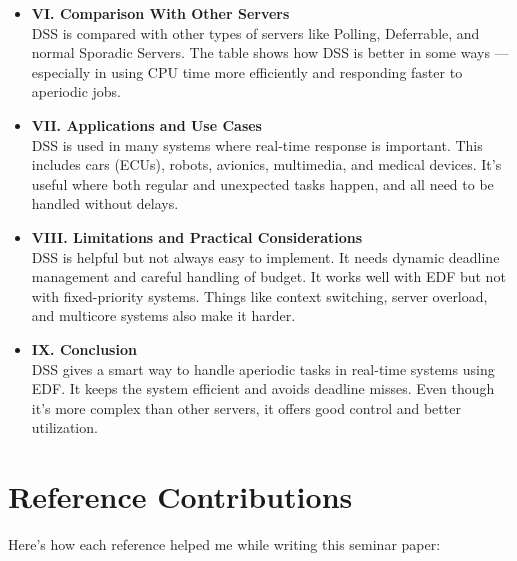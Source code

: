 \documentclass[conference]{IEEEtran}
\begin{document}
\begin{itemize}
    \item \textbf{VI. Comparison With Other Servers} \\
    DSS is compared with other types of servers like Polling, Deferrable, and normal Sporadic Servers. The table shows how DSS is better in some ways — especially in using CPU time more efficiently and responding faster to aperiodic jobs.

    \item \textbf{VII. Applications and Use Cases} \\
    DSS is used in many systems where real-time response is important. This includes cars (ECUs), robots, avionics, multimedia, and medical devices. It’s useful where both regular and unexpected tasks happen, and all need to be handled without delays.

    \item \textbf{VIII. Limitations and Practical Considerations} \\
    DSS is helpful but not always easy to implement. It needs dynamic deadline management and careful handling of budget. It works well with EDF but not with fixed-priority systems. Things like context switching, server overload, and multicore systems also make it harder.

    \item \textbf{IX. Conclusion} \\
    DSS gives a smart way to handle aperiodic tasks in real-time systems using EDF. It keeps the system efficient and avoids deadline misses. Even though it's more complex than other servers, it offers good control and better utilization.
\end{itemize}

\section*{Reference Contributions}

Here’s how each reference helped me while writing this seminar paper:
\end{document}

